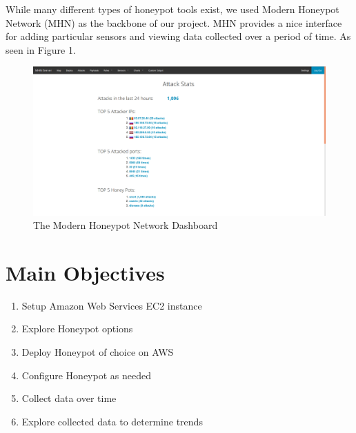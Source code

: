 \documentclass[a0,landscape]{a0poster}
\begin{document}
\begin{multicols}{3}
While many different types of honeypot tools exist, we used Modern Honeypot Network (MHN) as the backbone of our project. MHN provides a nice interface for adding particular sensors and viewing data collected over a period of time. As seen in Figure 1.
\begin{figure}[H]
	\begin{center}
	\includegraphics[width=28cm]{mhn.png}
	\caption{The Modern Honeypot Network Dashboard}
	\end{center}
\end{figure} 
	

\color{Black} %

\section*{Main Objectives}

\begin{enumerate}
\item Setup Amazon Web Services EC2 instance
\item Explore Honeypot options
\item Deploy Honeypot of choice on AWS
\item Configure Honeypot as needed
\item Collect data over time
\item Explore collected data to determine trends
\end{enumerate}


\end{multicols}
\end{document}
